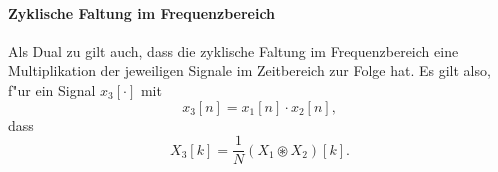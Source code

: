 \paragraph{Zyklische Faltung im Frequenzbereich}
%
Als Dual zu  gilt auch, dass die zyklische Faltung im Frequenzbereich eine Multiplikation der jeweiligen Signale im Zeitbereich zur Folge hat.
Es gilt also, f"ur ein Signal $x_3[\cdot]$ mit
\[
    x_3[n] = x_1[n] \cdot x_2[n],
\]
dass
\begin{equation}\label{eq:fourier:cycl_conv_dual}
    X_3[k] = \frac{1}{N}(X_1 \circledast X_2)[k].
\end{equation}
%
